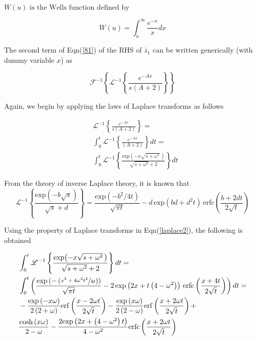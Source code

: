 \documentclass[10pt,a4,fleqn]{article}
\newcommand*{\rttensor}[1]{\overline{\overline{#1}}}
\begin{document}
$W(u) \text{ is the Wells function defined by } $ 

\begin{equation}
    W(u) = \int_u^{\infty} \frac{e^{-x}}{x}dx
\end{equation}


The second term of Eqn(\ref{81}) of the RHS of $\rttensor {z}_1$ can be written generically (with dummy variable $x$) as


\[\mathcal{F}^{-1}\left\{ \mathscr{L}^{-1}\left\{ \frac{e^{-Ax}}{s\left(A+2\right)}\right\} \right\}\]

Again, we begin by applying the laws of Laplace transforms as follows

\begin{equation}
\begin{aligned}
    &\mathscr{L}^{-1}\left\{ \frac{e^{-Ax}}{s\left(A+2\right)}\right\} = \\
    &\int_0^t\mathscr{L}^{-1}\left\{ \frac{e^{-Ax}}{\left(A+2\right)} \right\} dt = \\
    &\int_0^t\mathscr{L}^{-1}\left\{ \frac{\mathrm{exp}{\left(-x\sqrt{s+\omega^2} \, \right)}}{\sqrt{s+\omega^2}+2} \right\} dt
\end{aligned}
\end{equation}

From the theory of inverse Laplace theory, it is known that
\[ \mathscr{L}^{-1}\left\{ \frac{\mathrm{exp}\left(-b\sqrt{s}\right)}{\sqrt{s} + d}\right\}  = 
\frac{\mathrm{exp}\left(-b^2/4t\right)}{\sqrt{\pi t}} -d\,\mathrm{exp}\left(bd + d^2t\right)\, \mathrm{erfc}\left(\frac{b + 2dt}{2\sqrt{t}}\right) \]

Using the property of Laplace transforms in Eqn(\ref{laplace2}), the following is obtained

\begin{equation}
\begin{aligned}
    &\int_0^t\mathscr{L}^{-1}\left\{ \frac{\mathrm{exp}{\left(-x\sqrt{s+\omega^2} \, \right)}}{\sqrt{s+\omega^2}+2} \right\} dt = \\
&\int_0^t \left(\frac{\mathrm{exp}\left(-\left( \sfrac{x^2 + 4\omega^2 t^2}{4t}\right)\right)}{\sqrt{\pi t}} -2\,\mathrm{exp}\left(2x + t\left(4 - \omega^2\right)\right)\, \mathrm{erfc}\left(\frac{x + 4t}{2\sqrt{t}}\right) \right) dt  = \\  &-\frac{\mathrm{exp}\left(-x\omega\right)}{2\left(2+\omega\right)}\mathrm{erf}\left(\frac{x - 2\omega t}{2\sqrt{t}}\right) - \frac{\mathrm{exp}\left(x\omega\right)}{2\left(2-\omega\right)}\mathrm{erf}\left(\frac{x + 2\omega t}{2\sqrt{t}}\right) + \\
&\frac{\mathrm{cosh}\left(x\omega\right)}{2-\omega}
- \frac{2\mathrm{exp}\left(2x+\left(4-\omega^2\right)t\right)}{4-\omega^2}\mathrm{erfc}\left(\frac{x + 2\omega t}{2\sqrt{t}}\right)
\end{aligned}
\end{equation}
\end{document}
